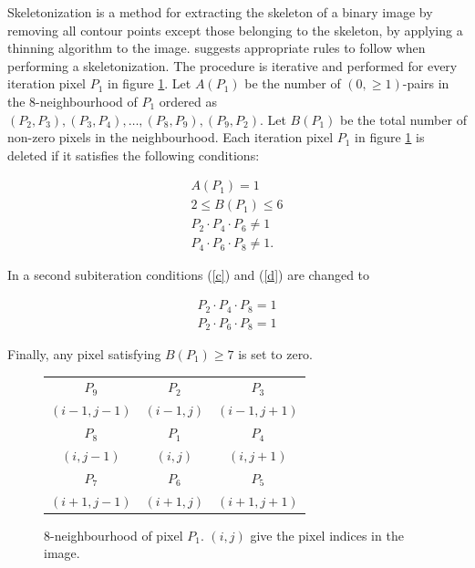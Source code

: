 Skeletonization is a method for extracting the skeleton of a binary image by removing all contour points except those belonging to the skeleton, by applying a thinning algorithm to the image. \cite{Zhang:skeleton} suggests appropriate rules to follow when performing a skeletonization. 
The procedure is iterative and performed for every iteration pixel $P_1$ in figure \ref{tab:theory/8neigh}. Let $A(P_1)$ be the number of $(0, \geq 1)$-pairs in the 8-neighbourhood of $P_1$ ordered as $(P_2, P_3), (P_3, P_4), \ldots, (P_8, P_9), (P_9, P_2)$. Let $B(P_1)$ be the total number of non-zero pixels in the neighbourhood. Each iteration pixel $P_1$ in figure \ref{tab:theory/8neigh} is deleted if it satisfies the following conditions:

\begin{align}
   A(P_1) = 1 \\
   2 \leq B(P_1) \leq 6 \\
   P_2\cdot P_4\cdot P_6 \neq 1 \label{c} \\ 
   P_4\cdot P_6\cdot P_8 \neq 1 \label{d}.
\end{align}

In a second subiteration conditions (\ref{c}) and (\ref{d}) are changed to 

\begin{align}
    P_2\cdot P_4\cdot P_8 = 1 \\ 
   P_2\cdot P_6\cdot P_8 = 1 
\end{align}

Finally, any pixel satisfying $B(P_1) \geq 7$ is set to zero.



\begin{figure}[H]
\centering
\begin{tabular}{|c|c|c|}
\hline
$P_9$ & $P_2$ & $P_3$ \\
$(i-1, j-1)$ & $(i-1, j)$ & $(i-1, j+1)$ \\ \hline
$P_8$ & $P_1$ & $P_4$ \\
$(i, j-1)$ & $(i, j)$ & $(i, j+1)$ \\ \hline
$P_7$ & $P_6$ & $P_5$ \\
$(i+1, j-1)$ & $(i+1, j)$ & $(i+1, j+1)$ \\ \hline
\end{tabular}\caption{8-neighbourhood of pixel $P_1$. $(i,j)$ give the pixel indices in the image.}
\label{tab:theory/8neigh}
\end{figure}

